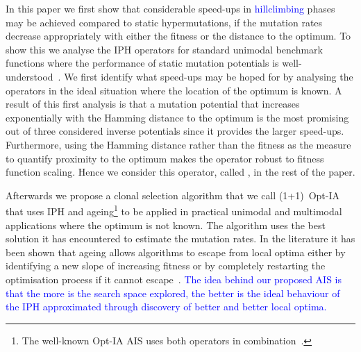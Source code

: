 \documentclass[lettersize,journal]{IEEEtran}
\newcommand{\new}[1]{\textcolor{blue}{#1}}
\begin{document}
In this paper we first show that considerable speed-ups in \new{hillclimbing} phases may be achieved compared to static hypermutations, 
if the mutation rates decrease appropriately with either the fitness or the distance to the optimum. 
To show this we analyse the IPH operators for standard unimodal benchmark functions where the performance of static mutation potentials is well-understood~\cite{CorusOlivetoYazdaniGECCO2017}.
We first identify what speed-ups may be hoped for by analysing the operators in the ideal situation where the location of the optimum is known.
A result of this first analysis is that a mutation potential that increases exponentially with the Hamming distance to the optimum is the most promising out of three considered 
inverse potentials since it provides the larger speed-ups. Furthermore, using the Hamming distance rather than the fitness as the measure to quantify proximity to the optimum
makes the operator robust to fitness function scaling.
Hence we consider this operator, called  \expoHD, in the rest of the paper.

Afterwards we propose a clonal selection algorithm that we call (1+1)~Opt-IA
that uses IPH and ageing\footnote{The well-known Opt-IA AIS uses both operators in combination~\cite{CutelloNicosiaPavoneTimmis2007}.} \cite{CutelloNicosiaPavoneTimmis2007} to be applied in practical unimodal and multimodal applications where the optimum is not known. 
The algorithm uses the best solution it has encountered to estimate the mutation rates.
In the literature it has been shown that ageing allows algorithms to escape from local optima either by identifying a new slope of increasing fitness or by completely restarting the optimisation process if it cannot escape~\cite{OlivetoSudholt2014ageing,CorusOlivetoYazdaniGECCO2017,CorusOlivetoYazdaniAIJ2019,HorobaJansenZarges09,JansenZarges2011}. 
\new{The idea behind our proposed AIS is that the more is the search space explored, the better is the ideal behaviour of the IPH approximated through discovery of better and better local optima.}
\end{document}
